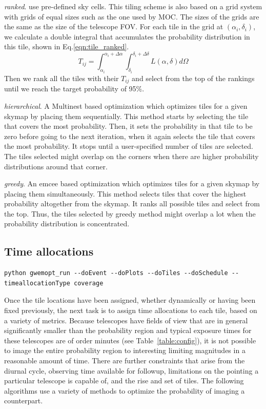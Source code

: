 \documentclass[twocolumn]{aastex61}
\begin{document}
\emph{ranked}. \cite{GhBl2016} use pre-defined sky cells. This tiling scheme is also based on a grid system with grids of equal sizes such as the one used by MOC. The sizes of the grids are the same as the size of the telescope FOV. For each tile in the grid at $(\alpha_i, \delta_i)$, we calculate a double integral that accumulates the probability distribution in this tile, shown in Eq.\ref{eqn:tile_ranked}.
\begin{equation}\label{eqn:tile_ranked}
T_{ij} = \int_{\alpha_i}^{\alpha_i+\Delta \alpha}\int_{\delta_i}^{\delta_i+\Delta \delta}L(\alpha, \delta)d\Omega
\end{equation}
Then we rank all the tiles with their $T_{ij}$ and select from the top of the rankings until we reach the target probability of 95\%.

\emph{hierarchical}. A Multinest based optimization which optimizes tiles for a given skymap by placing them sequentially. This method starts by selecting the tile that covers the most probability. Then, it sets the probability in that tile to be zero before going to the next iteration, when it again selects the tile that covers the most probability. It stops until a user-specified number of tiles are selected. The tiles selected might overlap on the corners when there are higher probability distributions around that corner. 
 
\emph{greedy}. An emcee based optimization which optimizes tiles for a given skymap by placing them simultaneously. This method selects tiles that cover the highest probability altogether from the skymap. It ranks all possible tiles and select from the top. Thus, the tiles selected by greedy method might overlap a lot when the probability distribution is concentrated.

\subsection{Time allocations}
\begin{lstlisting}
python gwemopt_run --doEvent --doPlots --doTiles --doSchedule --timeallocationType coverage
\end{lstlisting}
Once the tile locations have been assigned, whether dynamically or having been fixed previously, the next task is to assign time allocations to each tile, based on a variety of metrics. 
Because telescopes have fields of view that are in general significantly smaller than the probability region and typical exposure times for these telescopes are of order minutes (see Table~\ref{table:config}), it is not possible to image the entire probability region to interesting limiting magnitudes in a reasonable amount of time.
There are further constraints that arise from the diurnal cycle, observing time available for followup, limitations on the pointing a particular telescope is capable of, and the rise and set of tiles.
The following algorithms use a variety of methods to optimize the probability of imaging a counterpart.
\end{document}
